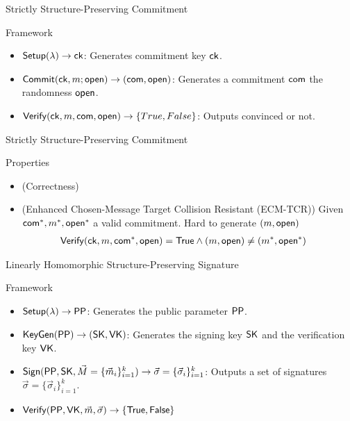 \begin{frame}{Strictly Structure-Preserving Commitment~\cite{DBLP:conf/eurocrypt/AbeKOT15}}

  \begin{block}{Framework}
      \begin{itemize}
      \item ${\mathsf{Setup}}(\lambda) \to \mathsf{ck}$: Generates commitment key $\mathsf{ck}$.
      \item ${\mathsf{Commit}}(\mathsf{ck}, m; \mathsf{open}) \to (\mathsf{com},\mathsf{open})$: Generates a commitment $\mathsf{com}$ \wrt the randomness $\mathsf{open}$.
      \item ${\mathsf{Verify}}(\mathsf{ck}, m, \mathsf{com}, \mathsf{open}) \to \{True, False\}$: Outputs convinced or not.
      \end{itemize}
  \end{block}
\end{frame}
\begin{frame}{Strictly Structure-Preserving Commitment~\cite{DBLP:conf/eurocrypt/AbeKOT15}}
  \begin{block}{Properties}
    \begin{itemize}
    \item {\color{blue}(Correctness)} %
    \item {\color{blue}(Enhanced Chosen-Message Target Collision Resistant (ECM-TCR))} Given $\mathsf{com}^*, m^*, \mathsf{open}^*$ a valid commitment. Hard to generate $(m, \mathsf{open})$ \st
      \begin{align*}
        {\mathsf{Verify}}(\mathsf{ck}, m, \mathsf{com}^*, \mathsf{open}) &= \mathsf{True} \wedge (m, \mathsf{open}) \neq (m^*, \mathsf{open}^*)
      \end{align*}
    \end{itemize}
  \end{block}


\end{frame}


\begin{frame}{Linearly Homomorphic Structure-Preserving Signature}
  \begin{block}{Framework}
  \begin{itemize}
  \item $\boldmath{{\mathsf{Setup}}(\lambda) \to \mathsf{PP}}$: Generates the public parameter $\mathsf{PP}$.
  \item $\boldmath{{\mathsf{KeyGen}}(\mathsf{PP}) \to (\mathsf{SK}, \mathsf{VK})}$: Generates the signing key $\mathsf{SK}$ and the verification key $\mathsf{VK}$.
  \item $\boldmath{{\mathsf{Sign}}(\mathsf{PP}, \mathsf{SK}, \vec{M} = \{\vec{m}_i\}_{i=1}^k) \to \vec{\sigma} = \{\vec{\sigma}_i\}_{i=1}^k}$: Outputs a set of signatures $\vec{\sigma} = \{\vec{\sigma}_i\}_{i=1}^k$.
  \item $\boldmath{{\mathsf{Verify}}(\mathsf{PP}, \mathsf{VK}, \vec{m}, \vec{\sigma}) \to \{\mathsf{True}, \mathsf{False}\}}$
  \end{itemize}
  \end{block}
\end{frame}

